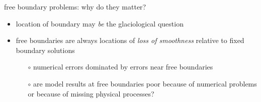 \begin{frame}{free boundary problems: why do they matter?}
\begin{itemize}
\item location of boundary may \emph{be} the glaciological question
\item free boundaries are always locations of \emph{loss of smoothness} relative to fixed boundary solutions
     \begin{itemize}
     \item[$\circ$] numerical errors dominated by errors near free boundaries 
     \item[$\circ$] are model results at free boundaries poor because of numerical problems or because of missing physical processes?
     \end{itemize}
\end{itemize}
\end{frame}